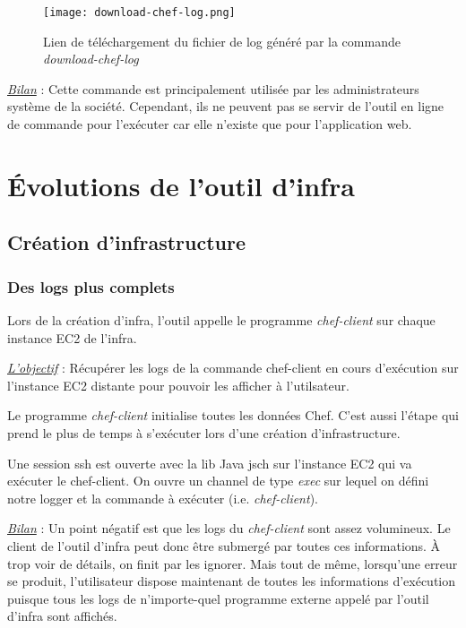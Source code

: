 \begin{figure}[H]
  \texttt{[image: download-chef-log.png]}
  \caption{Lien de téléchargement du fichier de log généré par la commande \textit{download-chef-log}}
\end{figure}

\underline{\textit{Bilan}} : Cette commande est principalement utilisée par les
administrateurs système de la société. Cependant, ils ne peuvent pas se servir
de l'outil en ligne de commande pour l'exécuter car elle n'existe que pour
l'application web.

\section{Évolutions de l'outil d'infra}

\subsection{Création d'infrastructure}

\subsubsection{Des logs plus complets}

Lors de la création d'infra, l'outil appelle le programme \textit{chef-client}
sur chaque instance EC2 de l'infra. 

\underline{\textit{L'objectif}} : Récupérer les logs de la commande chef-client
en cours d'exécution sur l'instance EC2 distante pour pouvoir les afficher à
l'utilsateur.

Le programme \textit{chef-client} initialise toutes les données Chef.
C'est aussi l'étape qui prend le plus de temps à s'exécuter lors d'une création
d'infrastructure.

Une session ssh est ouverte avec la lib Java jsch sur l'instance EC2 qui va
exécuter le chef-client. On ouvre un channel de type \textit{exec} sur lequel on
défini notre logger et la commande à exécuter (i.e. \textit{chef-client}).

\underline{\textit{Bilan}} : Un point négatif est que les logs du
\textit{chef-client} sont assez volumineux. Le client de l'outil d'infra 
peut donc être submergé par toutes ces informations. À trop voir de détails, on
finit par les ignorer. Mais tout de même, lorsqu'une erreur se produit,
l'utilisateur dispose maintenant de toutes les informations d'exécution puisque
tous les logs de n'importe-quel programme externe appelé par l'outil d'infra
sont affichés.


